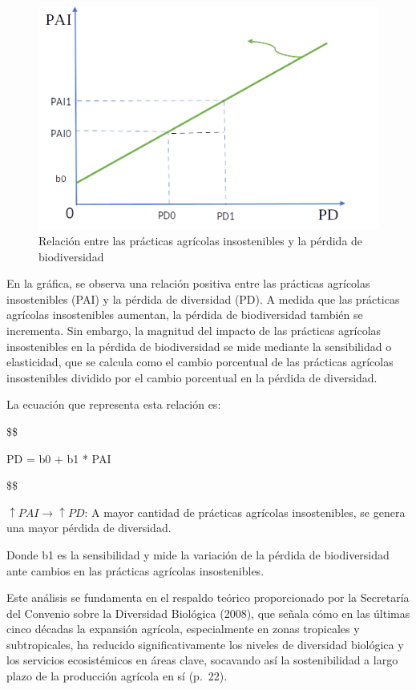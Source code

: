 \documentclass[
  letterpaper,
  DIV=11,
  numbers=noendperiod]{scrartcl}
\begin{document}
\begin{figure}

\caption{\label{fig-1}Relación entre las prácticas agrícolas
insostenibles y la pérdida de biodiversidad}

{\centering \includegraphics{20230603001915.png}

}

\end{figure}

En la gráfica, se observa una relación positiva entre las prácticas
agrícolas insostenibles (PAI) y la pérdida de diversidad (PD). A medida
que las prácticas agrícolas insostenibles aumentan, la pérdida de
biodiversidad también se incrementa. Sin embargo, la magnitud del
impacto de las prácticas agrícolas insostenibles en la pérdida de
biodiversidad se mide mediante la sensibilidad o elasticidad, que se
calcula como el cambio porcentual de las prácticas agrícolas
insostenibles dividido por el cambio porcentual en la pérdida de
diversidad.

La ecuación que representa esta relación es:

\$\$

PD = b0 + b1 * PAI

\$\$

\(↑PAI → ↑PD\): A mayor cantidad de prácticas agrícolas insostenibles,
se genera una mayor pérdida de diversidad.

Donde b1 es la sensibilidad y mide la variación de la pérdida de
biodiversidad ante cambios en las prácticas agrícolas insostenibles.

Este análisis se fundamenta en el respaldo teórico proporcionado por la
Secretaría del Convenio sobre la Diversidad Biológica (2008), que señala
cómo en las últimas cinco décadas la expansión agrícola, especialmente
en zonas tropicales y subtropicales, ha reducido significativamente los
niveles de diversidad biológica y los servicios ecosistémicos en áreas
clave, socavando así la sostenibilidad a largo plazo de la producción
agrícola en sí (p.~22).
\end{document}
